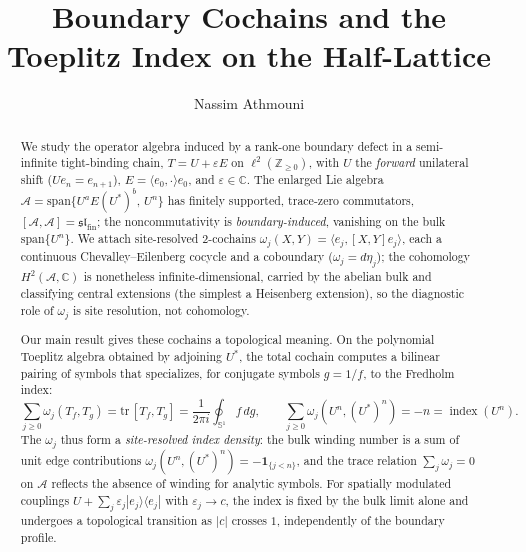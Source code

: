 \documentclass[10pt]{amsart}
\newcommand{\Z}{{\mathbb{Z}}}
\newcommand{\1}{{\mathbb{I}}}
\newcommand{\ind}{\operatorname{index}}
\numberwithin{equation}{section}
\begin{document}
\title{Boundary Cochains and the Toeplitz Index on the Half-Lattice}
\author{Nassim Athmouni}
\address{Universit\'e de Gafsa, Facult\'e des Sciences, Campus Universitaire 2112, Gafsa, Tunisie}



\begin{abstract}
We study the operator algebra induced by a rank-one boundary defect in a semi-infinite
tight-binding chain, $T = U + \varepsilon E$ on $\ell^2(\mathbb{Z}_{\ge 0})$, with $U$ the
\emph{forward} unilateral shift ($Ue_n = e_{n+1}$), $E = \langle e_0,\cdot\rangle e_0$, and
$\varepsilon \in \mathbb{C}$. The enlarged Lie algebra
$\mathcal{A} = \mathrm{span}\{U^a E (U^*)^b,\, U^n\}$ has finitely supported, trace-zero
commutators, $[\mathcal{A},\mathcal{A}] = \mathfrak{sl}_{\mathrm{fin}}$; the noncommutativity is
\emph{boundary-induced}, vanishing on the bulk $\mathrm{span}\{U^n\}$. We attach site-resolved
$2$-cochains $\omega_j(X,Y) = \langle e_j, [X,Y] e_j \rangle$, each a continuous
Chevalley--Eilenberg cocycle and a coboundary ($\omega_j=d\eta_j$); the cohomology
$H^2(\mathcal{A},\mathbb{C})$ is nonetheless infinite-dimensional, carried by the abelian bulk
and classifying central extensions (the simplest a Heisenberg extension), so the diagnostic role
of $\omega_j$ is site resolution, not cohomology.

Our main result gives these cochains a topological meaning. On the polynomial Toeplitz algebra
obtained by adjoining $U^*$, the total cochain computes a bilinear pairing of symbols that
specializes, for conjugate symbols $g=1/f$, to the Fredholm index:
\[
\sum_{j\ge0}\omega_j(T_f,T_g)=\mathrm{tr}\,[T_f,T_g]=\frac{1}{2\pi i}\oint_{\mathbb{S}^1} f\,dg,
\qquad
\sum_{j\ge0}\omega_j(U^n,(U^*)^n)=-n=\ind(U^n).
\]
The $\omega_j$ thus form a \emph{site-resolved index density}: the bulk winding number is a sum
of unit edge contributions $\omega_j(U^n,(U^*)^n)=-\mathbf{1}_{\{j<n\}}$, and the trace relation
$\sum_j\omega_j=0$ on $\mathcal{A}$ reflects the absence of winding for analytic symbols. For
spatially modulated couplings $U+\sum_j\varepsilon_j|e_j\rangle\langle e_j|$ with
$\varepsilon_j\to c$, the index is fixed by the bulk limit alone and undergoes a topological
transition as $|c|$ crosses $1$, independently of the boundary profile.
\end{abstract}
\end{document}
